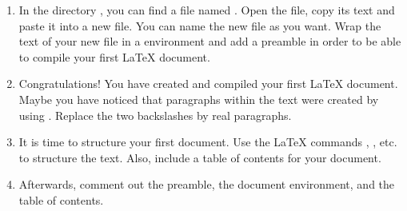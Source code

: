 \begin{enumerate}
	\item In the directory , you can 
	find a file named . Open the 
	file, copy its text and paste it into a new file. You can name the new file 
	as you want. Wrap the text of your new file in a 
	 environment and add a preamble in order to be 
	able to compile your first \LaTeX{} document. 
	\item Congratulations! You have created and compiled your first \LaTeX{} 
	document. Maybe you have noticed that paragraphs within the text were 
	created by using . Replace the 
	two backslashes by real paragraphs.
	\item It is time to structure your first document. Use the \LaTeX{} 
	commands , 
	, etc. to structure the text. 
	Also, 
	include 
	a table of contents for your document. 
	\item Afterwards, comment out the preamble, the document environment, and the table of contents. 
\end{enumerate}

